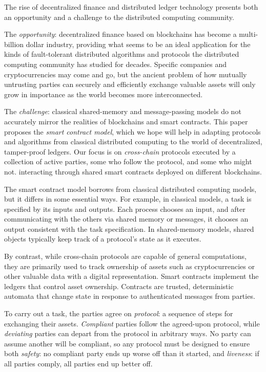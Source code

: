 The rise of decentralized finance and distributed ledger
technology presents both an opportunity and a challenge
to the distributed computing community.

The \emph{opportunity}: decentralized finance based on blockchains
has become a multi-billion dollar industry,
providing what seems to be an ideal application for the kinds of
fault-tolerant distributed algorithms and protocols
the distributed computing community has studied for decades.
Specific companies and cryptocurrencies may come and go,
but the ancient problem of how mutually untrusting parties can securely and efficiently exchange
valuable assets will only grow in importance as the world becomes more interconnected.

The \emph{challenge}:
classical 
 shared-memory and message-passing models
do not accurately mirror the realities of blockchains and smart contracts.
This paper proposes the \emph{smart contract model},
which we hope will help in adapting protocols and algorithms
from classical distributed computing to the world of decentralized, tamper-proof ledgers.
Our focus is on \emph{cross-chain} protocols
executed by a collection of active parties, some who follow the protocol, and some who might not.
interacting through shared smart contracts deployed on different blockchains. 

The smart contract model borrows from classical distributed computing models,
but it differs in some essential ways.
For example, in classical models,
a task is specified by its inputs and outputs.
Each process chooses an input,
and after communicating with the others via shared memory or messages,
it chooses an output consistent with the task specification.
In shared-memory models, 
shared objects typically keep track of a protocol's state as it executes.

By contrast,
while cross-chain protocols are capable of general computations,
they are primarily used to track ownership of assets
such as cryptocurrencies or other valuable data with a digital representation.
Smart contracts implement the ledgers that control
asset ownership.
Contracts are trusted, deterministic automata that change state in response
to authenticated messages from parties.

To carry out a task,
the parties agree on \emph{protocol}:
a sequence of steps for exchanging their assets.
\emph{Compliant} parties follow the agreed-upon protocol,
while \emph{deviating} parties can depart from the protocol in arbitrary ways.
No party can assume another will be compliant,
so any protocol must be designed to ensure both \emph{safety}:
no compliant party ends up worse off than it started,
and \emph{liveness}:
if all parties comply, all parties end up better off.

